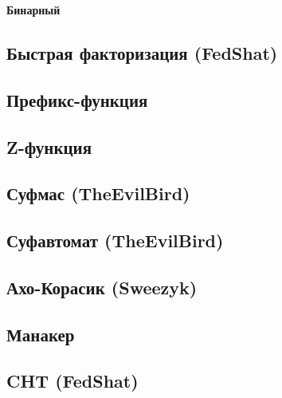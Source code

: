 \documentclass[a4paper]{article}
\begin{document}
\begin{multicols*}{2}
            \textbf{Бинарный}
            
        
        \subsection{Быстрая факторизация (FedShat)}
            

        \subsection{Префикс-функция}
            
            
        \subsection{Z-функция}
            
            
        \subsection{Суфмас (TheEvilBird)}
            
            
        \subsection{Суфавтомат (TheEvilBird)}
            
        
        \subsection{Ахо-Корасик (Sweezyk)}
            
            
        \subsection{Манакер}
            
            
        \subsection{CHT (FedShat)}
            
        

\end{multicols*}
\end{document}
